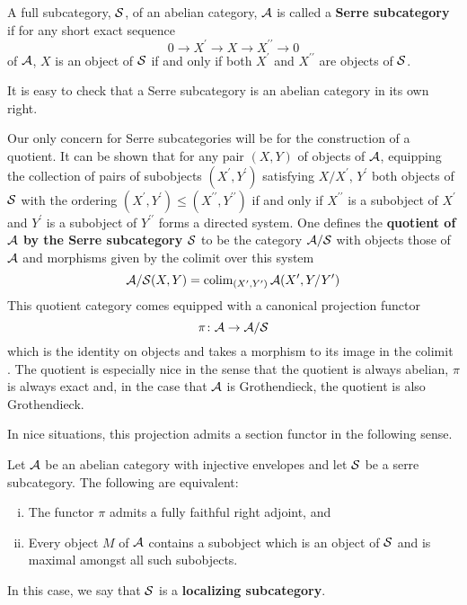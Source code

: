 \begin{definition}
  A full subcategory, \(\mathcal{S}\), of an abelian category, \(\mathcal{A}\) is called a \textbf{Serre subcategory} if for any short exact sequence
  \[0 \to X^\prime \to X \to X^{\prime\prime} \to 0\]
  of \(\mathcal{A}\), \(X\) is an object of \(\mathcal{S}\) if and only if both \(X^\prime\) and \(X^{\prime\prime}\) are objects of \(\mathcal{S}\).
\end{definition}

\begin{remark}
  It is easy to check that a Serre subcategory is an abelian category in its own right.
\end{remark}

Our only concern for Serre subcategories will be for the construction of a quotient.
It can be shown that for any pair \((X,Y)\) of objects of \(\mathcal{A}\), equipping the collection of pairs of subobjects \((X^\prime, Y^\prime)\) satisfying \(X/X^\prime\), \(Y^\prime\) both objects of \(\mathcal{S}\) with the ordering \((X^\prime, Y^\prime) \leq (X^{\prime\prime}, Y^{\prime\prime})\) if and only if \(X^{\prime\prime}\) is a subobject of \(X^\prime\) and \(Y^\prime\) is a subobject of \(Y^{\prime\prime}\) forms a directed system.
One defines the \textbf{quotient of \(\mathcal{A}\) by the Serre subcategory \(\mathcal{S}\)} to be the category \(\mathcal{A}/\mathcal{S}\) with objects those of \(\mathcal{A}\) and morphisms given by the colimit over this system
\[\mathcal{A}/\mathcal{S}(X,Y) = \operatorname{colim}_{(X^\prime, Y^\prime)} \mathcal{A}(X^\prime, Y/Y^\prime)\]
This quotient category comes equipped with a canonical projection functor
\[\pi \colon \mathcal{A} \to \mathcal{A}/\mathcal{S}\]
which is the identity on objects and takes a morphism to its image in the colimit \cite[Cor. 1, III.1]{DCA62}.
The quotient is especially nice in the sense that the quotient is always abelian, \(\pi\) is always exact and, in the case that \(\mathcal{A}\) is Grothendieck, the quotient is also Grothendieck.

In nice situations, this projection admits a section functor in the following sense.

\begin{proposition}\label{prop: existence of serre functor}
  Let \(\mathcal{A}\) be an abelian category with injective envelopes and let \(\mathcal{S}\) be a serre subcategory.
  The following are equivalent:
  \begin{enumerate}[(i)]
  \item
    The functor \(\pi\) admits a fully faithful right adjoint, and
  \item
    Every object \(M\) of \(\mathcal{A}\) contains a subobject which is an object of \(\mathcal{S}\) and is maximal amongst all such subobjects.
  \end{enumerate}
  In this case, we say that \(\mathcal{S}\) is a \textbf{localizing subcategory}.
\end{proposition}

